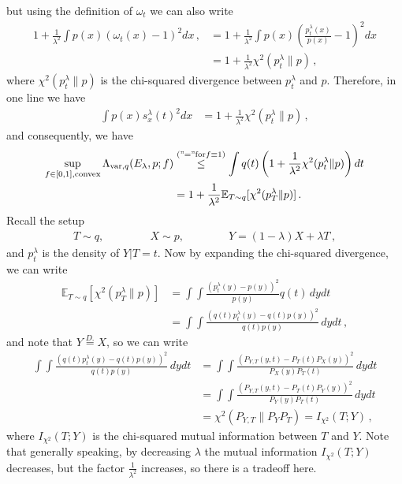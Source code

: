 \documentclass{article}
\theoremstyle{plain}
\theoremstyle{definition}
\theoremstyle{plain}
\newcommand{\E}{\mathbb E}
\begin{document}
but using the definition of $\omega_t$ we can also write
\begin{align}
    1 + \frac{1}{\lambda^2}\int p(x) (\omega_t(x) - 1)^2 dx\,,
     & = 1 + \frac{1}{\lambda^2}\int p(x) (\frac{p_t^\lambda(x)}{p(x)} - 1)^2 dx \\
     & = 1 + \frac{1}{\lambda^2} \chi^2(p_t^\lambda \| p)\,,
\end{align}
where $\chi^2(p_t^\lambda \| p)$ is the chi-squared divergence between $p_t^\lambda$ and $p$.
Therefore, in one line we have
\begin{align}
    \int p(x) s_x^\lambda(t)^2 dx
     & = 1 + \frac{1}{\lambda^2} \chi^2(p_t^\lambda \| p)\,,
\end{align}
and consequently, we have
\begin{align}
    \sup_{f \in [0,1], \textrm{convex}}\Lambda_{\text{var}, q}(E_\lambda, p; f)
     & \stackrel{(\mathrm{"="for} f\equiv 1)}{\le} \int q(t) \left(1 + \frac{1}{\lambda^2} \chi^2(p_t^\lambda \| p)\right) dt \\
     & = 1 + \frac{1}{\lambda^2} \E_{T\sim q}[\chi^2(p_T^\lambda \| p)]\,.
\end{align}
Recall the setup
\begin{align}
    T \sim q,\,  \qquad \qquad X \sim p, \qquad \qquad
    Y                = (1-\lambda) X + \lambda T\, ,
\end{align}
and $p_t^\lambda$ is the density of $Y|T=t$.
Now by expanding the chi-squared divergence, we can write
\begin{align}
    \E_{T\sim q}[\chi^2(p_T^\lambda \| p)]
     & =
    \int \int
    \frac{
        (p_t^\lambda(y) - p(y))^2
    }{p(y)} q(t) \, dy dt \\
     & =
    \int \int
    \frac{
        \left(q(t)p_t^\lambda(y) - q(t)p(y)\right)^2
    }{q(t) p(y)} \, dy dt\,,
\end{align}
and note that $Y \stackrel{D.}{=} X$, so we can write
\begin{align}
    \int \int
    \frac{
        \left(q(t)p_t^\lambda(y) - q(t)p(y)\right)^2
    }{q(t) p(y)} \, dy dt
     & =
    \int \int
    \frac{
        \left(P_{Y,T}(y,t) - P_T(t)P_X(y)\right)^2
    }{P_X(y) P_T(t)} \, dy dt                            \\
     & =
    \int \int
    \frac{
        \left(P_{Y,T}(y,t) - P_T(t)P_Y(y)\right)^2
    }{P_Y(y) P_T(t)} \, dy dt                            \\
     & = \chi^2(P_{Y,T} \| P_Y P_T) = I_{\chi^2}(T;Y)\,,
\end{align}
where $I_{\chi^2}(T;Y)$ is the chi-squared mutual information between $T$ and $Y$.
Note that generally speaking, by decreasing $\lambda$ the mutual information $I_{\chi^2}(T;Y)$ decreases, but the factor $\frac{1}{\lambda^2}$ increases, so there is a tradeoff here.
\end{document}
